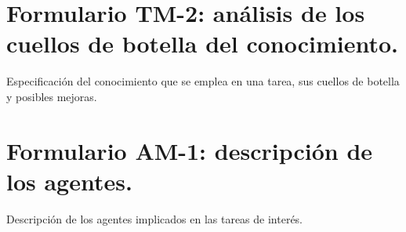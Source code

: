 \section{Formulario TM-2: análisis de los cuellos de botella del conocimiento.}
Especificación del conocimiento que se emplea en una tarea, sus cuellos de botella y posibles mejoras.

\section{Formulario AM-1: descripción de los agentes.}
Descripción de los agentes implicados en las tareas de interés.

 






